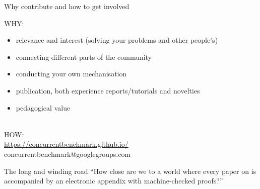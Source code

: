 \documentclass[aspectratio=169,hyperref={pdfpagelabels=false}]{beamer}
\begin{document}

\begin{frame}{Why contribute and how to get involved}

  WHY:
  \begin{itemize}
  \item relevance and interest (solving your problems and other people's)
  \item connecting different parts of the community
  \item conducting your own mechanisation
  \item publication, both experience reports/tutorials and novelties
  \item pedagogical value
  \end{itemize}

  \ \\
  HOW:\\ 
  \url{https://concurrentbenchmark.github.io/}\\
  concurrentbenchmark@googlegroups.com 
  
\end{frame}

\begin{frame}{The long and winding road}
  ``How close are we to a world where every paper on  is accompanied by an electronic appendix with machine-checked proofs?''

  \ \\

  
\end{frame}
\end{document}
